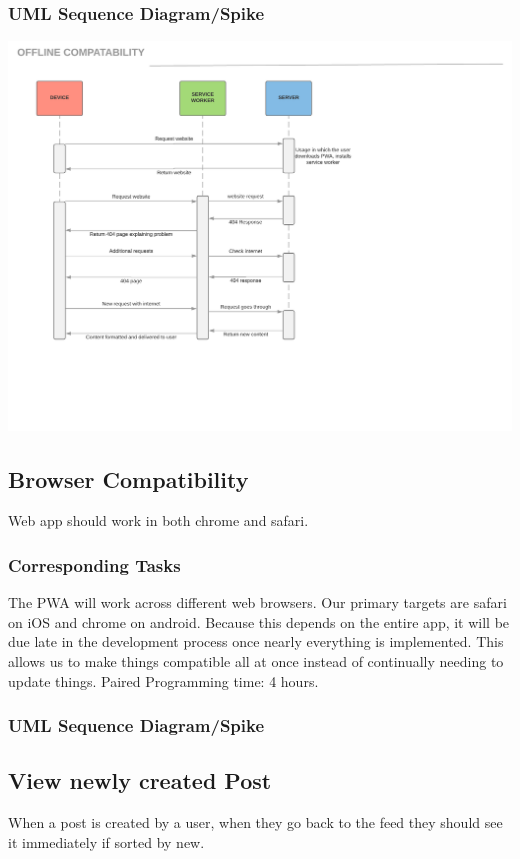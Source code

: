 \documentclass[12pt]{article}
\begin{document}
\subsubsection{UML Sequence Diagram/Spike}
\includegraphics[scale=0.5]{img/10.png}\linebreak

\subsection{Browser Compatibility}
Web app should work in both chrome and safari.
\subsubsection{Corresponding Tasks}
	The PWA will work across different web browsers.  Our primary targets are safari on iOS and chrome on android.  Because this depends on the entire app, it will be due late in the development process once nearly everything is implemented.  This allows us to make things compatible all at once instead of continually needing to update things.  Paired Programming time: 4 hours.
\subsubsection{UML Sequence Diagram/Spike}

\subsection{View newly created Post}
When a post is created by a user, when they go back to the feed they should see
it immediately if sorted by new.
\end{document}
